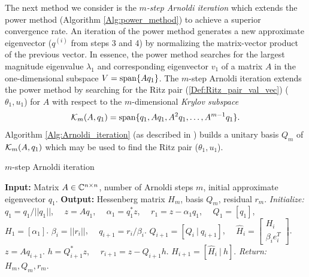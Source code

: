 \begin{enumerate}
The next method we consider is the \textit{$m$-step Arnoldi iteration} which extends the power method (Algorithm \ref{Alg:power_method}) to achieve a superior convergence rate.  An iteration of the power method generates a new approximate eigenvector ($q^{(i)}$ from steps 3 and 4) by normalizing the matrix-vector product of the previous vector.  In essence, the power method searches for the largest magnitude eigenvalue $\lambda_1$ and corresponding eigenvector $v_1$ of a matrix $A$ in the one-dimensional subspace $V = \textnormal{span} \{ Aq_1 \}$.  The $m$-step Arnoldi iteration extends the power method by searching for the Ritz pair (\ref{Def:Ritz_pair_val_vec}) ($\theta_1, u_1$) for $A$ with respect to the $m$-dimensional \textit{Krylov subspace}
\begin{equation}
{\mathcal K}_m(A, q_1) = \textnormal{span}\{ q_1, Aq_1, A^2q_1, \ldots, A^{m-1}q_1 \}.
\label{Def:krylov_subspace}
\end{equation}
Algorithm \ref{Alg:Arnoldi_iteration} (as described in \cite[Algorithm 10.5.1]{golub2012matrix}) builds a unitary basis $Q_m$ of ${\mathcal K}_m(A, q_1)$ which may be used to find the Ritz pair ($\theta_1, u_1$).
\begin{algorithm}[H]
\caption{$m$-step Arnoldi iteration}	\label{Alg:Arnoldi_iteration}

\begin{algorithmic}[1]
	\Statex		\textbf{Input:} Matrix $A \in {\mathbb C}^{n \times n}$, number of Arnoldi steps $m$, initial approximate eigenvector $q_1$.
	\Statex 	\textbf{Output:} Hessenberg matrix $H_m$, basis $Q_m$, residual $r_m$.
	\State		\textit{Initialize:} $q_1  = q_1 / ||q_1||$, \ \ $z = Aq_1$, \ \ $\alpha_1 = q_1^*z$, \ \ $r_1 = z - \alpha_1 q_1$, \ \ $Q_1 = [q_1]$, \ \ $H_1 = [\alpha_1]$.
		\State	$\beta_i = ||r_i||$, \ \ $q_{i+1} = r_i / \beta_i$.
		\State	$Q_{i+1} = [Q_i \ | \ q_{i+1}]$, \ \ $\hat{H}_i = \begin{bmatrix}	H_i \\  \beta_i e_i^T	\end{bmatrix}$.
		\State	$z = Aq_{i+1}$.
		\State	$h = Q_{i+1}^*z$, \ \  $r_{i+1} = z - Q_{i+1}h$.
		\State	$H_{i+1} = [\hat{H}_i \ | \ h]$.
	\EndFor
	\State		\textit{Return:} $H_m, Q_m, r_m$.
\end{algorithmic}

\end{algorithm}


\end{enumerate}
